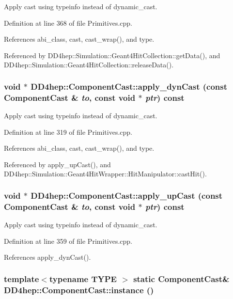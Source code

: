 Apply cast using typeinfo instead of dynamic\_\-cast. 

Definition at line 368 of file Primitives.cpp.

References abi\_\-class, cast, cast\_\-wrap(), and type.

Referenced by DD4hep::Simulation::Geant4HitCollection::getData(), and DD4hep::Simulation::Geant4HitCollection::releaseData().\hypertarget{class_d_d4hep_1_1_component_cast_aace12e8cef1815233b06c108f0d85082}{
\subsubsection[{apply\_\-dynCast}]{\setlength{\rightskip}{0pt plus 5cm}void $\ast$ DD4hep::ComponentCast::apply\_\-dynCast (const {\bf ComponentCast} \& {\em to}, \/  const void $\ast$ {\em ptr}) const}}
\label{class_d_d4hep_1_1_component_cast_aace12e8cef1815233b06c108f0d85082}


Apply cast using typeinfo instead of dynamic\_\-cast. 

Definition at line 319 of file Primitives.cpp.

References abi\_\-class, cast, cast\_\-wrap(), and type.

Referenced by apply\_\-upCast(), and DD4hep::Simulation::Geant4HitWrapper::HitManipulator::castHit().\hypertarget{class_d_d4hep_1_1_component_cast_a07a0c4c9fe6a3d703602df77211ce37e}{
\subsubsection[{apply\_\-upCast}]{\setlength{\rightskip}{0pt plus 5cm}void $\ast$ DD4hep::ComponentCast::apply\_\-upCast (const {\bf ComponentCast} \& {\em to}, \/  const void $\ast$ {\em ptr}) const}}
\label{class_d_d4hep_1_1_component_cast_a07a0c4c9fe6a3d703602df77211ce37e}


Apply cast using typeinfo instead of dynamic\_\-cast. 

Definition at line 359 of file Primitives.cpp.

References apply\_\-dynCast().\hypertarget{class_d_d4hep_1_1_component_cast_a0bd14bc60af0175c7dad5164128cf030}{
\subsubsection[{instance}]{\setlength{\rightskip}{0pt plus 5cm}template$<$typename TYPE $>$ static {\bf ComponentCast}\& DD4hep::ComponentCast::instance ()}}
\label{class_d_d4hep_1_1_component_cast_a0bd14bc60af0175c7dad5164128cf030}


